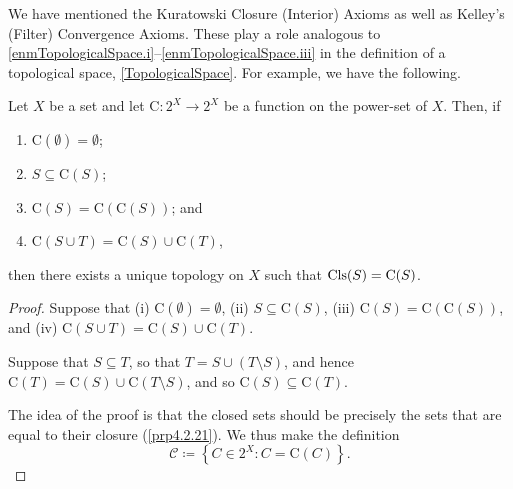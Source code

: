 We have mentioned the Kuratowski Closure (Interior) Axioms as well as Kelley's (Filter) Convergence Axioms.  These play a role analogous to \ref{enmTopologicalSpace.i}--\ref{enmTopologicalSpace.iii} in the definition of a topological space, \cref{TopologicalSpace}.  For example, we have the following.
\begin{thm}\label{KuratowskisClosureTheorem}
Let $X$ be a set and let $\mathrm{C}:2^X\rightarrow 2^X$ be a function on the power-set of $X$.  Then, if
\begin{enumerate}
\item \label{enmKuratowskiClosureTheorem.i}$\mathrm{C}(\emptyset )=\emptyset$;
\item \label{enmKuratowskiClosureTheorem.ii}$S\subseteq \mathrm{C}(S)$;
\item \label{enmKuratowskiClosureTheorem.iii}$\mathrm{C}(S)=\mathrm{C}\left( \mathrm{C}(S)\right)$; and
\item \label{enmKuratowskiClosureTheorem.iv}$\mathrm{C}(S\cup T)=\mathrm{C}(S)\cup \mathrm{C}(T)$,
\end{enumerate}
then there exists a unique topology on $X$ such that $\operatorname{Cls} (S)=\mathrm{C}(S)$.
\begin{proof}
Suppose that (i) $\mathrm{C}(\emptyset )=\emptyset$, (ii) $S\subseteq \mathrm{C}(S)$, (iii) $\mathrm{C}(S)=\mathrm{C}\left( \mathrm{C}(S)\right)$, and (iv) $\mathrm{C}(S\cup T)=\mathrm{C}(S)\cup \mathrm{C}(T)$.

\label{stpKuratowskiClosureTheorem.2}
Suppose that $S\subseteq T$, so that $T=S\cup (T\setminus S)$, and hence $\mathrm{C}(T)=\mathrm{C}(S)\cup \mathrm{C}(T\setminus S)$, and  so $\mathrm{C}(S)\subseteq \mathrm{C}(T)$.

The idea of the proof is that the closed sets should be precisely the sets that are equal to their closure (\cref{prp4.2.21}).  We thus make the definition
\begin{equation}
\mathcal{C}\coloneqq \left\{ C\in 2^X:C=\mathrm{C}(C)\right\} .
\end{equation}


\end{proof}
\end{thm}
